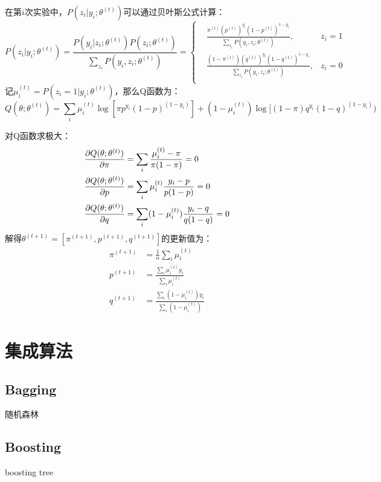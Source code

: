 {} 
在第$i$次实验中，$P(z_i|y_i;\theta^{(t)})$可以通过贝叶斯公式计算：
\begin{equation*}
    P(z_i|y_i;\theta^{(t)}) = \frac{P(y_i|z_i;\theta^{(t)}) P(z_i; \theta^{(t)})}{\sum_{z_i}P(y_i, z_i; \theta^{(t)})} = 
    \left\{
        \begin{aligned}
            & \frac{\pi^{(t)} (p^{(t)})^{y_i} (1-p^{(t)})^{1-y_i}}{\sum_{z_i}P(y_i, z_i; \theta^{(t)})}, & z_i = 1\\
            & \frac{(1-\pi^{(t)})(q^{(t)})^{y_i} (1-q^{(t)})^{1-y_i}}{\sum_{z_i}P(y_i, z_i; \theta^{(t)})}, & z_i = 0\\
        \end{aligned}
    \right.
\end{equation*}
记$\mu_i^{(t)} = P(z_i=1|y_i;\theta^{(t)})$，那么Q函数为：
\begin{equation*}
    Q(\theta; \theta^{(t)}) = \sum_i \mu_i^{(t)}\log[\pi p^{y_i}(1-p)^{(1-y_i)}]
    + (1-\mu_i^{(t)}) \log[(1-\pi)q^{y_i}(1-q)^{(1-y_i)})
\end{equation*}

{} 对Q函数求极大：
\begin{align*}
    \frac{\partial Q(\theta; \theta^{(t)})}{\partial \pi} &= \sum_i \frac{\mu_i^{(t)} - \pi}{\pi(1-\pi)} = 0 \\
    \frac{\partial Q(\theta; \theta^{(t)})}{\partial p} &= \sum_i \mu_i^{(t)} \frac{y_i - p}{p(1-p)} = 0 \\
    \frac{\partial Q(\theta; \theta^{(t)})}{\partial q} &= \sum_i (1-\mu_i^{(t)}) \frac{y_i - q}{q(1-q)} = 0
\end{align*}
解得$\theta^{(t+1)} = [\pi^{(t+1)}, p^{(t+1)}, q^{(t+1)}]$的更新值为：
\begin{align*}
    \pi^{(t+1)} &= \frac 1 n \sum_i \mu_i^{(t)} \\
    p^{(t+1)} &= \frac{\sum_i \mu_i^{(t)} y_i}{\sum_i \mu_i^{(t)}}  \\
    q^{(t+1)} &= \frac{\sum_i (1-\mu_i^{(t)}) y_i}{\sum_i (1-\mu_i^{(t)})}
\end{align*}



\section{集成算法}
\subsection{Bagging}
随机森林
\subsection{Boosting}
boosting tree

